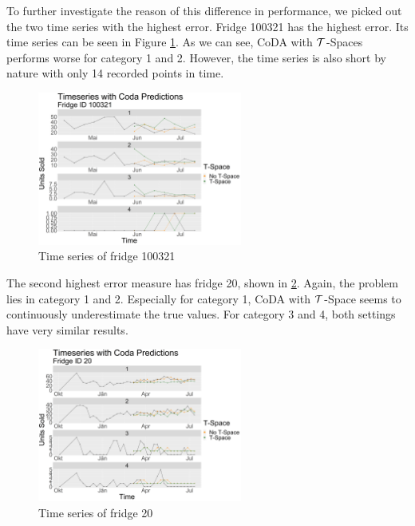 To further investigate the reason of this difference in performance, we picked out the two time series with the highest error. Fridge 100321 has the highest error. Its time series can be seen in Figure \ref{fig:Coda_Timeseries_VariationtSpace100321}. As we can see, CoDA with $\mathcal{T}$-Spaces performs worse for category 1 and 2. However, the time series is also short by nature with only 14 recorded points in time.  

\begin{figure}[htbp]
	\centering
		\includegraphics[width=0.6\textwidth]{Graphiken/Coda_Timeseries_VariationtSpace100321.png}
	\caption{Time series of fridge 100321}
	\label{fig:Coda_Timeseries_VariationtSpace100321}
\end{figure}

The second highest error measure has fridge 20, shown in \ref{fig:Coda_Timeseries_VariationtSpace20}. Again, the problem lies in category 1 and 2. Especially for category 1, CoDA with $\mathcal{T}$-Space seems to continuously underestimate the true values. For category 3 and 4, both settings have very similar results.

\begin{figure}[htbp]
	\centering
		\includegraphics[width=0.6\textwidth]{Graphiken/Coda_Timeseries_VariationtSpace20.png}
	\caption{Time series of fridge 20}
	\label{fig:Coda_Timeseries_VariationtSpace20}
\end{figure}

